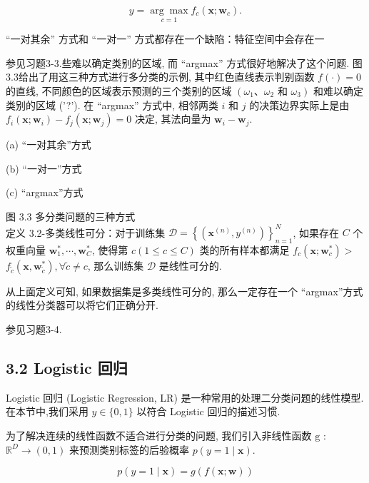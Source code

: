 \documentclass[10pt]{article}
\begin{document}
\begin{equation*}
y=\underset{c=1}{\arg \max } f_{c}\left(\boldsymbol{x} ; \boldsymbol{w}_{c}\right) . \tag{3.11}
\end{equation*}


“一对其余” 方式和 “一对一” 方式都存在一个缺陷：特征空间中会存在一

参见习题3-3.些难以确定类别的区域, 而 “argmax” 方式很好地解决了这个问题. 图3.3给出了用这三种方式进行多分类的示例, 其中红色直线表示判别函数 $f(\cdot)=0$ 的直线, 不同颜色的区域表示预测的三个类别的区域 $\left(\omega_{1} 、 \omega_{2}\right.$ 和 $\left.\omega_{3}\right)$ 和难以确定类别的区域 ('?'). 在 “argmax” 方式中, 相邻两类 $i$ 和 $j$ 的决策边界实际上是由 $f_{i}\left(\boldsymbol{x} ; \boldsymbol{w}_{i}\right)-f_{j}\left(\boldsymbol{x} ; \boldsymbol{w}_{j}\right)=0$ 决定, 其法向量为 $\boldsymbol{w}_{i}-\boldsymbol{w}_{j}$.



(a) “一对其余”方式



(b) “一对一”方式



(c) “argmax”方式

图 3.3 多分类问题的三种方式\\
定义 3.2-多类线性可分：对于训练集 $\mathcal{D}=\left\{\left(\boldsymbol{x}^{(n)}, y^{(n)}\right)\right\}_{n=1}^{N}$, 如果存在 $C$ 个权重向量 $\boldsymbol{w}_{1}^{*}, \cdots, \boldsymbol{w}_{C}^{*}$, 使得第 $c(1 \leq c \leq C)$ 类的所有样本都满足 $f_{c}\left(\boldsymbol{x} ; \boldsymbol{w}_{c}^{*}\right)>$ $f_{\tilde{c}}\left(\boldsymbol{x}, \boldsymbol{w}_{\tilde{c}}^{*}\right), \forall \tilde{c} \neq c$, 那么训练集 $\mathcal{D}$ 是线性可分的.

从上面定义可知, 如果数据集是多类线性可分的, 那么一定存在一个 “argmax”方式的线性分类器可以将它们正确分开.

参见习题3-4.

\subsection*{3.2 Logistic 回归}
Logistic 回归 (Logistic Regression, LR) 是一种常用的处理二分类问题的线性模型. 在本节中,我们采用 $y \in\{0,1\}$ 以符合 Logistic 回归的描述习惯.

为了解决连续的线性函数不适合进行分类的问题, 我们引入非线性函数 $\mathrm{g}$ : $\mathbb{R}^{D} \rightarrow(0,1)$ 来预测类别标签的后验概率 $p(y=1 \mid \boldsymbol{x})$.


\begin{equation*}
p(y=1 \mid \boldsymbol{x})=g(f(\boldsymbol{x} ; \boldsymbol{w})) \tag{3.12}
\end{equation*}
\end{document}
